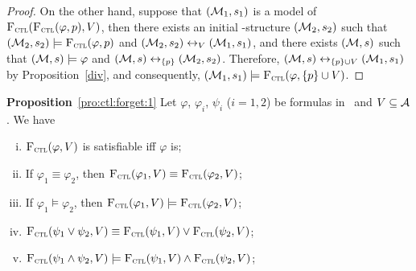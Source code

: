 \documentclass{article}
\begin{document}
\begin{proof}
 On the other hand, suppose that $({\cal M}_1, s_1)$ is a model of ${\textsc{F}_{\textsc{ctl}}}({\textsc{F}_{\textsc{ctl}}}(\varphi, p), V)$, then there exists an initial \MPK-structure $({\cal M}_2, s_2)$ such that $({\cal M}_2, s_2) \models {\textsc{F}_{\textsc{ctl}}}(\varphi, p)$ and $({\cal M}_2, s_2) \leftrightarrow_V ({\cal M}_1, s_1)$, and there exists $({\cal M}, s)$ such that $({\cal M}, s) \models \varphi$ and $({\cal M}, s) \leftrightarrow_{\{p\}} ({\cal M}_2, s_2)$. Therefore, $({\cal M}, s) \leftrightarrow_{\{p\} \cup V} ({\cal M}_1, s_1)$ by Proposition~\ref{div}, and consequently, $({\cal M}_1, s_1) \models {\textsc{F}_{\textsc{ctl}}}(\varphi, \{p\} \cup V)$.
 \end{proof}



 \noindent\textbf{Proposition}~\ref{pro:ctl:forget:1}
 Let $\varphi$, $\varphi_i$, $\psi_i$ ($i=1,2$) be formulas in \CTL\ and $V\subseteq {\cal A}$. We have
 \begin{enumerate}[(i)]
   \item ${\textsc{F}_{\textsc{ctl}}}(\varphi, V)$ is satisfiable iff $\varphi$ is;
   \item If $\varphi_1 \equiv \varphi_2$, then ${\textsc{F}_{\textsc{ctl}}}(\varphi_1, V) \equiv {\textsc{F}_{\textsc{ctl}}}(\varphi_2, V)$;
   \item If $\varphi_1 \models \varphi_2$, then ${\textsc{F}_{\textsc{ctl}}}(\varphi_1, V) \models {\textsc{F}_{\textsc{ctl}}}(\varphi_2, V)$;
   \item ${\textsc{F}_{\textsc{ctl}}}(\psi_1 \vee \psi_2, V) \equiv {\textsc{F}_{\textsc{ctl}}}(\psi_1, V) \vee {\textsc{F}_{\textsc{ctl}}}(\psi_2, V)$;
   \item ${\textsc{F}_{\textsc{ctl}}}(\psi_1 \wedge \psi_2, V) \models {\textsc{F}_{\textsc{ctl}}}(\psi_1, V) \wedge {\textsc{F}_{\textsc{ctl}}}(\psi_2, V)$;
 \end{enumerate}
\end{document}
